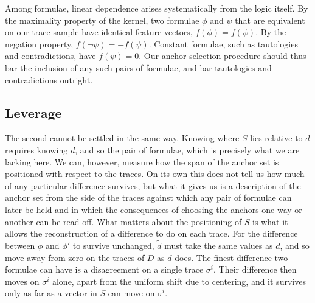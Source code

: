 \documentclass[titlepage,a4paper,11pt]{report}
\begin{document}
    Among formulae, linear dependence arises systematically from the logic itself. By the maximality property of the kernel, two formulae $\phi$ and $\psi$ that are equivalent on our trace sample have identical feature vectors, $f(\phi) = f(\psi)$. By the negation property, $f(\neg\psi) = -f(\psi)$. Constant formulae, such as tautologies and contradictions, have $f(\psi)=0$. Our anchor selection procedure should thus bar the inclusion of any such pairs of formulae, and bar tautologies and contradictions outright.

    \subsection{Leverage}\label{sec:leverage}
    The second cannot be settled in the same way. Knowing where $S$ lies relative to $d$ requires knowing $d$, and so the pair of formulae, which is precisely what we are lacking here. We can, however, measure how the span of the anchor set is positioned with respect to the traces. On its own this does not tell us how much of any particular difference survives, but what it gives us is a description of the anchor set from the side of the traces against which any pair of formulae can later be held and in which the consequences of choosing the anchors one way or another can be read off. What matters about the positioning of $S$ is what it allows the reconstruction of a difference to do on each trace. For the difference between $\phi$ and $\phi'$ to survive unchanged, $\tilde d$ must take the same values as $d$, and so move away from zero on the traces of $D$ as $d$ does. The finest difference two formulae can have is a disagreement on a single trace $\sigma^i$. Their difference then moves on $\sigma^i$ alone, apart from the uniform shift due to centering, and it survives only as far as a vector in $S$ can move on $\sigma^i$.
    
\end{document}
